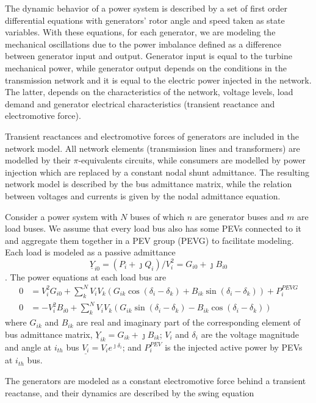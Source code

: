 \documentclass[final,12pt]{elsarticle}
\begin{document}
The dynamic behavior of a power system is described by a set of
first order differential equations with generators' rotor angle and speed taken
as state variables. With these equations, for each generator, we are modeling
the mechanical oscillations due to the power imbalance defined as a difference
between generator input and output. Generator input is equal to the turbine
mechanical power, while generator output depends on the conditions in the
transmission network and it is equal to the electric power injected in the
network. The latter, depends on the characteristics of the network, voltage
levels, load demand and generator electrical characteristics (transient
reactance and electromotive force).

Transient reactances and electromotive forces of generators are included in the
network model. All network elements (transmission lines and transformers) are
modelled by their $\pi$-equivalents circuits, while consumers are modelled by
power injection which are replaced by a constant nodal shunt admittance.
The resulting network model is described by the bus admittance matrix, while the
relation between voltages and currents is given by the nodal admittance
equation.

Consider a power system with $N$ buses of which $n$ are generator buses and $m$
are load buses. We assume that every load bus also has some PEVs connected to it
and aggregate them together in a PEV group (PEVG) to facilitate modeling.
Each load is modeled as a passive admittance
$${\underline{Y}_{i0} = \left( P_{i}+\jmath Q_{i} \right) / V_{i}^2 = G_{i0}+\jmath B_{i0}}$$. The power equations at each load bus are
\begin{align}
0 &= V_i^2 G_{i0} + \sum_k^N V_i V_k \left( G_{ik}\cos(\delta_i-\delta_k)+B_{ik}\sin(\delta_i-\delta_k) \right) + P_i^{PEVG} \nonumber\\
0 &= -V_i^2 B_{i0} + \sum_k^N V_i V_k \left( G_{ik}\sin(\delta_i-\delta_k)-B_{ik}\cos(\delta_i-\delta_k) \right) \label{eq:PQ_load}
\end{align}
where $G_{ik}$ and $B_{ik}$ are real and
imaginary part of the corresponding element of bus admittance matrix,
$\underline{Y}_{ik} = G_{ik} + \jmath B_{ik}$; $V_i$ and $\delta_i$ are the
voltage magnitude and angle at $i_{th}$ bus $\underline{V_i} = V_i
e^{\jmath \delta_i}$; and $P_i^{PEV}$ is the injected 
active power by PEVs at $i_{th}$ bus.

The generators are modeled as a constant electromotive force behind a transient
reactanse, and their dynamics are described by the swing equation
\end{document}
